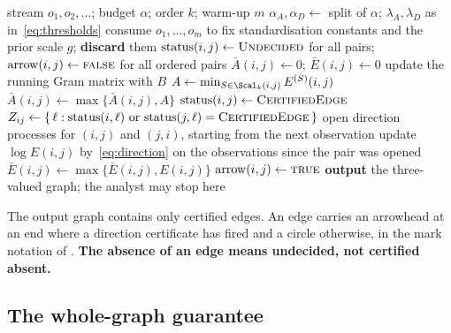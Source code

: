 \begin{algorithm}[t]
\caption{CERT-CD}\label{alg:certcd}
\begin{algorithmic}[1]
\Require stream $o_1, o_2, \dots$; budget $\alpha$; order $k$; warm-up $m$
\State $\alpha_A, \alpha_D \gets$ split of $\alpha$;
       $\lambda_A, \lambda_D$ as in~\eqref{eq:thresholds}
\State consume $o_1,\dots,o_m$ to fix standardisation constants and the prior
       scale $g$; \textbf{discard} them
\State $\mathrm{status}(i,j) \gets \textsc{Undecided}$ for all pairs;
       $\mathrm{arrow}(i,j) \gets \textsc{false}$ for all ordered pairs
\State $\bar A(i,j) \gets 0$; $\bar E(i,j) \gets 0$
  \State update the running Gram matrix with $B$
    \State $A \gets \min_{S \in \Scal_k(i,j)} E^{(S)}(i,j)$
    \State $\bar A(i,j) \gets \max\{\bar A(i,j), A\}$
      \State $\mathrm{status}(i,j) \gets \textsc{CertifiedEdge}$
      \State $Z_{ij} \gets \{\,\ell : \mathrm{status}(i,\ell) \text{ or }
             \mathrm{status}(j,\ell) = \textsc{CertifiedEdge} \,\}$
      \State open direction processes for $(i,j)$ and $(j,i)$, starting from
             the next observation
    \EndIf
  \EndFor
    \State update $\log E(i,j)$ by~\eqref{eq:direction} on the observations
           since the pair was opened
    \State $\bar E(i,j) \gets \max\{\bar E(i,j), E(i,j)\}$
     $\mathrm{arrow}(i,j) \gets \textsc{true}$
    \EndIf
  \EndFor
  \State \textbf{output} the three-valued graph; the analyst may stop here
\EndFor
\end{algorithmic}
\end{algorithm}

The output graph contains only certified edges. An edge carries an arrowhead
at an end where a direction certificate has fired and a circle otherwise, in
the mark notation of \citet{richardson2002ancestral}. \textbf{The absence of
an edge means undecided, not certified absent.}

\subsection{The whole-graph guarantee}\label{sec:theorem}

